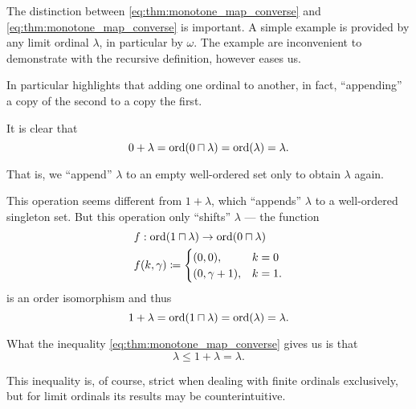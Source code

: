 \begin{example}\label{ex:ordinal_addition}
  The distinction between \eqref{eq:thm:monotone_map_converse} and \eqref{eq:thm:monotone_map_converse} is important. A simple example is provided by any limit ordinal \( \lambda \), in particular by \( \omega \). The example are inconvenient to demonstrate with the recursive definition, however  eases us.

  In particular  highlights that adding one ordinal to another, in fact, \enquote{appending} a copy of the second to a copy the first.

  It is clear that
  \begin{equation*}
    0 + \lambda = \operatorname{ord}(0 \sqcap \lambda) = \operatorname{ord}(\lambda) = \lambda.
  \end{equation*}

  That is, we \enquote{append} \( \lambda \) to an empty well-ordered set only to obtain \( \lambda \) again.

  This operation seems different from \( 1 + \lambda \), which \enquote{appends} \( \lambda \) to a well-ordered singleton set. But this operation only \enquote{shifts} \( \lambda \) --- the function
  \begin{equation*}
    \begin{aligned}
      &f: \operatorname{ord}(1 \sqcap \lambda) \to \operatorname{ord}(0 \sqcap \lambda) \\
      &f(k, \gamma) \coloneqq \begin{cases}
        (0, 0),          &k = 0 \\
        (0, \gamma + 1), &k = 1.
      \end{cases}
    \end{aligned}
  \end{equation*}
  is an order isomorphism and thus
  \begin{equation*}
    1 + \lambda = \operatorname{ord}(1 \sqcap \lambda) = \operatorname{ord}(\lambda) = \lambda.
  \end{equation*}

  What the inequality \eqref{eq:thm:monotone_map_converse} gives us is that
  \begin{equation*}
    \lambda \leq 1 + \lambda = \lambda.
  \end{equation*}

  This inequality is, of course, strict when dealing with finite ordinals exclusively, but for limit ordinals its results may be counterintuitive.


\end{example}
